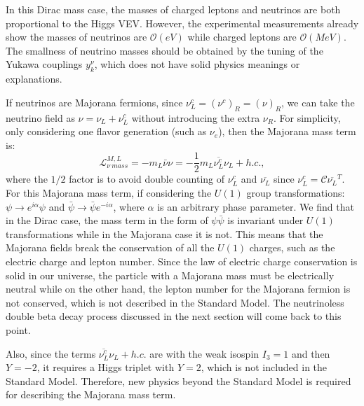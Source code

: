 In this Dirac mass case, the masses of charged leptons and neutrinos are both proportional to the Higgs VEV. However, the experimental measurements already show the masses of neutrinos are $\mathcal O(eV)$ 
while charged leptons are $\mathcal O(MeV)$. The smallness of neutrino masses should be obtained by the tuning of the Yukawa couplings $y_k^\nu$, which does not have solid physics meanings or explanations.

If neutrinos are Majorana fermions, since $\nu_L^c=(\nu^c)_R=(\nu)_R$, we can take the neutrino field as $\nu=\nu_L+\nu_L^c$ without introducing the extra $\nu_R$. For simplicity, only considering one flavor generation (such as $\nu_e$), then the Majorana mass term is:  
\begin{equation}\label{major_mass}
\mathcal{L}^{M,L}_{\nu~mass} = -m_L\bar{\nu}\nu=-\frac{1}{2}m_L\overline{\nu_L^c}\nu_L+h.c.,
\end{equation}
where the $1/2$ factor is to avoid double counting of $\nu_L^c$ and $\overline{\nu_L}$ since $\nu_L^c=\mathcal{C}\overline{\nu_L}^T$\cite{giunti2007fundamentals}. For this Majorana mass term, if considering the $U(1)$ group transformations: $\psi\to e^{i\alpha}\psi$ and $\bar \psi \to \bar\psi e^{-i\alpha}$, where $\alpha$ is an arbitrary phase parameter. We find that in the Dirac case, the mass term in the form of $\psi\bar\psi$ is invariant under $U(1)$ transformations while in the Majorana case it is not. This means that the Majorana fields break the conservation of all the $U(1)$ charges, such as the electric charge and lepton number\cite{akhmedov2014majorana}. Since the law of electric charge conservation is solid in our universe, the particle with a Majorana mass must be electrically neutral while on the other hand, the lepton number for the Majorana fermion is not conserved, which is not described in the Standard Model. The neutrinoless double beta decay process discussed in the next section will come back to this point.

Also, since the terms $\overline{\nu_L^c}\nu_L+h.c.$ are with the weak isospin $I_3=1$ and then $Y=-2$, it requires a Higgs triplet with $Y=2$, which is not included in the Standard Model\cite{funchal2013physics}. Therefore, new physics beyond the Standard Model is required for describing the Majorana mass term.

